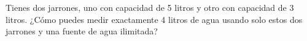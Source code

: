 Tienes dos jarrones, uno con capacidad de 5 litros y otro con capacidad de 3 litros. ¿Cómo puedes medir exactamente 4 litros de agua usando solo estos dos jarrones y una fuente de agua ilimitada?